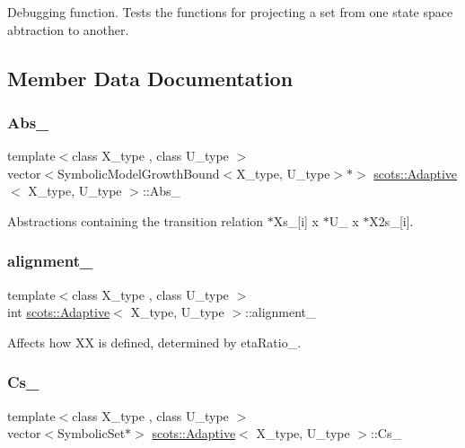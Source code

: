 Debugging function. Tests the functions for projecting a set from one state space abtraction to another. 

\subsection{Member Data Documentation}
\mbox{\label{classscots_1_1Adaptive_ab51fe5639ecc8fd046c1d2d56fb25890}} 
\subsubsection{\texorpdfstring{Abs\+\_\+}{Abs\_}}
{\footnotesize\ttfamily template$<$class X\+\_\+type , class U\+\_\+type $>$ \\
vector$<$Symbolic\+Model\+Growth\+Bound$<$X\+\_\+type, U\+\_\+type$>$$\ast$$>$ \hyperlink{classscots_1_1Adaptive}{scots\+::\+Adaptive}$<$ X\+\_\+type, U\+\_\+type $>$\+::Abs\+\_\+}

Abstractions containing the transition relation  $\ast$\+Xs\+\_\+\mbox{[}i\mbox{]} x $\ast$\+U\+\_\+ x $\ast$\+X2s\+\_\+\mbox{[}i\mbox{]}. \mbox{\label{classscots_1_1Adaptive_ad4f525a5a65b284da14369a54532cf39}} 
\subsubsection{\texorpdfstring{alignment\+\_\+}{alignment\_}}
{\footnotesize\ttfamily template$<$class X\+\_\+type , class U\+\_\+type $>$ \\
int \hyperlink{classscots_1_1Adaptive}{scots\+::\+Adaptive}$<$ X\+\_\+type, U\+\_\+type $>$\+::alignment\+\_\+}

Affects how XX is defined, determined by eta\+Ratio\+\_\+. \mbox{\label{classscots_1_1Adaptive_a4937d441ac9758f33bcceeb9975fb1ce}} 
\subsubsection{\texorpdfstring{Cs\+\_\+}{Cs\_}}
{\footnotesize\ttfamily template$<$class X\+\_\+type , class U\+\_\+type $>$ \\
vector$<$Symbolic\+Set$\ast$$>$ \hyperlink{classscots_1_1Adaptive}{scots\+::\+Adaptive}$<$ X\+\_\+type, U\+\_\+type $>$\+::Cs\+\_\+}

